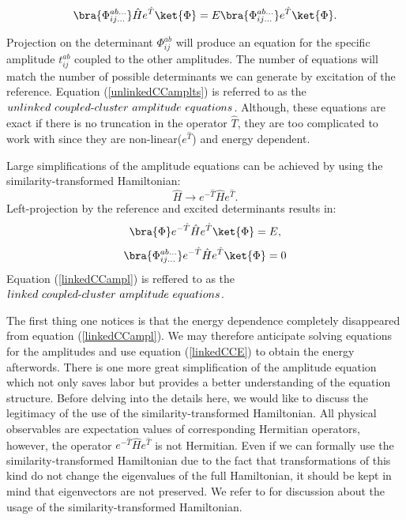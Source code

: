 \documentclass[twoside,english]{uiofysmaster}
\begin{document}
\begin{equation}\label{unlinkedCCE}
\bra{\Phi_{ij\dots}^{ab\dots}}\hat{H}e^{\hat{T}}\ket{\Phi} = E\bra{\Phi_{ij\dots}^{ab\dots}}e^{\hat{T}}\ket{\Phi}.
\end{equation}

Projection on the determinant ${\Phi_{ij}^{ab}}$ will produce an equation for the specific amplitude ${t_{ij}^{ab}}$ coupled to the other amplitudes. The number of equations will match the number of possible determinants we can generate by excitation of the reference. Equation (\ref{unlinkedCCamplts}) is referred to as the $unlinked\ coupled{\text -}cluster\ amplitude\ equations$. Although, these equations are exact if there is no truncation in the operator $\hat{T}$, they are too complicated to work with since they are non-linear($e^{\hat{T}}$) and energy dependent.

Large simplifications of the amplitude equations can be achieved by using the  similarity-transformed Hamiltonian: 
\[
\hat{H} \rightarrow e^{-\hat{T}}\hat{H}e^{\hat{T}}.
\]
Left-projection by the reference and excited determinants results in:
\begin{equation}\label{linkedCCE}
	\bra{\Phi}e^{-\hat{T}}\hat{H}e^{\hat{T}}\ket{\Phi} = E,
\end{equation}
\begin{equation}\label{linkedCCampl}
\bra{\Phi_{ij\dots}^{ab\dots}}e^{-\hat{T}}\hat{H}e^{\hat{T}}\ket{\Phi} = 0
\end{equation}
Equation (\ref{linkedCCampl}) is reffered to as the $linked\ coupled{\text -}cluster\ amplitude\ equations$.


The first thing one notices is that the energy dependence completely disappeared from equation (\ref{linkedCCampl}).
We may therefore anticipate solving equations for the amplitudes and use equation (\ref{linkedCCE}) to obtain the energy afterwords.
There is one more great simplification of the amplitude equation which not only saves labor but provides a better understanding of the equation structure. Before delving into the details here, we would like to discuss the legitimacy of the use of the similarity-transformed Hamiltonian. All physical observables are expectation values of corresponding Hermitian operators, however, the operator $e^{-\hat{T}}\hat{H}e^{\hat{T}}$ is not Hermitian.
Even if we can formally use the similarity-transformed Hamiltonian due to the fact that transformations of this kind do not change the eigenvalues of the full Hamiltonian, it should be kept in mind that eigenvectors are not preserved. We refer to \cite{Stantonequationmotioncoupled1993} for discussion about the usage of the similarity-transformed Hamiltonian.
\end{document}
